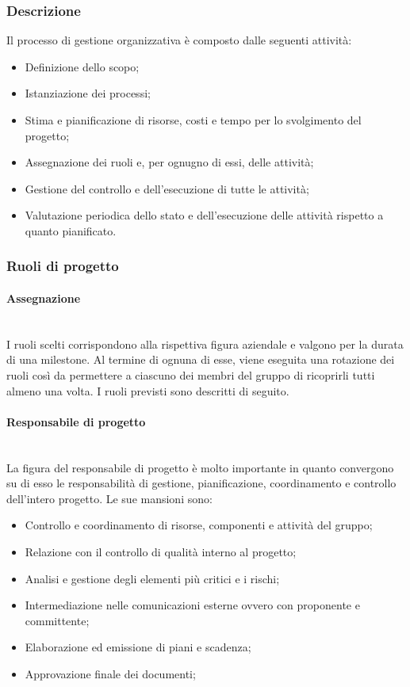 		\subsubsection{Descrizione}
			Il processo di gestione organizzativa è composto dalle seguenti attività:
			\begin{itemize}
				\item Definizione dello scopo;
				\item Istanziazione dei processi;
				\item Stima e pianificazione di risorse, costi e tempo per lo svolgimento del progetto;
				\item Assegnazione dei ruoli e, per ognugno di essi, delle attività;
				\item Gestione del controllo e dell'esecuzione di tutte le attività;
				\item Valutazione periodica dello stato e dell'esecuzione delle attività rispetto a quanto pianificato.
			\end{itemize}
		\subsubsection{Ruoli di progetto}
			\paragraph{Assegnazione}\mbox{}\\ [1mm]
				I ruoli scelti corrispondono alla rispettiva figura aziendale e valgono per la durata di una milestone. Al termine di ognuna di esse, viene eseguita una rotazione dei ruoli così da permettere a ciascuno dei membri del gruppo di ricoprirli tutti almeno una volta.
				I ruoli previsti sono descritti di seguito.
			\paragraph{Responsabile di progetto}\mbox{}\\ [1mm]
				La figura del responsabile di progetto è molto importante in quanto convergono su di esso le responsabilità di gestione, pianificazione, coordinamento e controllo dell'intero progetto.
				Le sue mansioni sono:
				\begin{itemize}
					\item Controllo e coordinamento di risorse, componenti e attività del gruppo;
					\item Relazione con il controllo di qualità interno al progetto;
					\item Analisi e gestione degli elementi più critici e i rischi;
					\item Intermediazione nelle comunicazioni esterne ovvero con proponente e committente;
					\item Elaborazione ed emissione di piani e scadenza;
					\item Approvazione finale dei documenti;
				\end{itemize}
